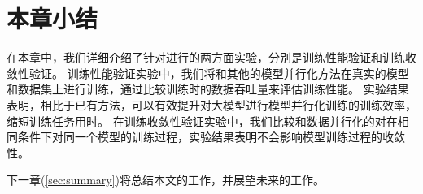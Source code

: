 \section{本章小结}
\label{sec:evaluation-summary}

在本章中，我们详细介绍了针对\sys{}进行的两方面实验，分别是训练性能验证和训练收敛性验证。
训练性能验证实验中，我们将\sys{}和其他的模型并行化方法在真实的模型和数据集上进行训练，通过比较训练时的数据吞吐量来评估训练性能。
实验结果表明，相比于已有方法，\sys{}可以有效提升对大模型进行模型并行化训练的训练效率，缩短训练任务用时。
在训练收敛性验证实验中，我们比较\sys{}和数据并行化的对在相同条件下对同一个模型的训练过程，实验结果表明\sys{}不会影响模型训练过程的收敛性。

下一章(\ref{sec:summary})将总结本文的工作，并展望未来的工作。